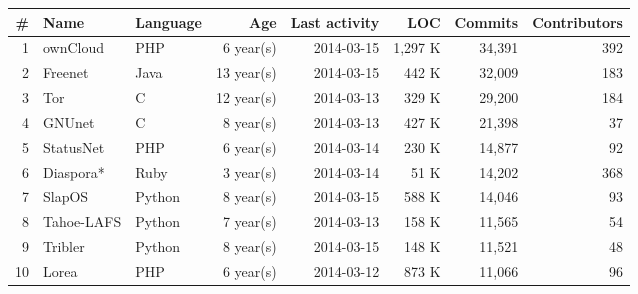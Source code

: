 \begin{tabular}[p]{| r | l | p{1.5cm} | r | r | r | r | r |}
	\hline
	\textbf{\#} & \textbf{Name} & \textbf{Language} & \textbf{Age} & \textbf{Last activity} & \textbf{LOC} & \textbf{Commits} & \textbf{Contributors} \\ \hline

	1 & ownCloud & PHP & 6 year(s) & 2014-03-15 & 1,297 K & 34,391 & 392 \\ \hline
	2 & Freenet & Java & 13 year(s) & 2014-03-15 & 442 K & 32,009 & 183 \\ \hline
	3 & Tor & C & 12 year(s) & 2014-03-13 & 329 K & 29,200 & 184 \\ \hline
	4 & GNUnet & C & 8 year(s) & 2014-03-13 & 427 K & 21,398 & 37 \\ \hline
	5 & StatusNet & PHP & 6 year(s) & 2014-03-14 & 230 K & 14,877 & 92 \\ \hline
	6 & Diaspora* & Ruby & 3 year(s) & 2014-03-14 & 51 K & 14,202 & 368 \\ \hline
	7 & SlapOS & Python & 8 year(s) & 2014-03-15 & 588 K & 14,046 & 93 \\ \hline
	8 &Tahoe-LAFS & Python & 7 year(s) & 2014-03-13 & 158 K & 11,565 & 54 \\ \hline
	9 & Tribler & Python & 8 year(s) & 2014-03-15 & 148 K & 11,521 & 48 \\ \hline
	10 & Lorea & PHP & 6 year(s) & 2014-03-12 & 873 K & 11,066 & 96 \\ \hline
\end{tabular}
